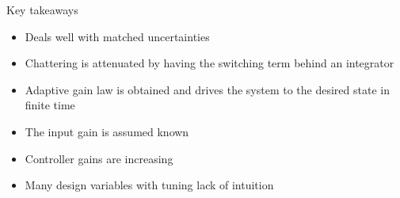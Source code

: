 Key takeaways
\begin{itemize}
    \item Deals well with matched uncertainties
    \item Chattering is attenuated by having the switching term behind an integrator
    \item Adaptive gain law is obtained and drives the system to the desired state in finite time
\end{itemize}
\begin{itemize}
    \item The input gain is assumed known
    \item Controller gains are increasing
    \item Many design variables with tuning lack of intuition
\end{itemize}
